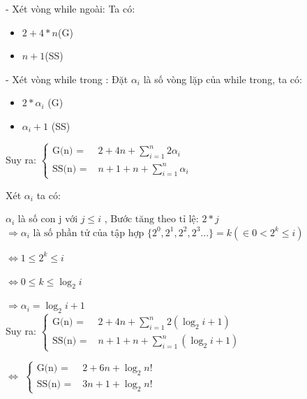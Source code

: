 \documentclass{article}
\newcommand\tab[1][1cm]{\hspace*{#1}}
\begin{document}
- Xét vòng while ngoài:
Ta có:
\begin{itemize}
    \item $ 2+4*n $(G)
    \item $ n + 1 $(SS)
\end{itemize}

- Xét vòng while trong :
Đặt $\alpha_{i}$ là số vòng lặp của while trong, ta có:
\begin{itemize}
    \item $ 2*\alpha_{i}$ (G)
    \item $ \alpha_{i} + 1$ (SS)
\end{itemize}

\tab Suy ra:
\(
\begin{cases}
    \text{G(n) = } & 2 + 4n +  \sum\limits_{i=1}^{n}2\alpha_{i} \\
    \text{SS(n) = } &  n + 1 + n + \sum\limits_{i=1}^{n}\alpha_{i}
\end{cases}
\)
\vspace{5mm}

Xét $\alpha_{i}$ ta có:

\tab $\alpha_{i}$ là số con j với $j \leq  i$ , \(\text{Bước tăng theo tỉ lệ: } 2*j\)\\

\(\Rightarrow  \alpha_{i} \text{ là số phần tử của tập hợp } \{ 2^0, 2^1,  2^2, 2^3... \}
= k (\in 0 < 2^k \leq  i)\) 
\vspace{5mm}

\(\Leftrightarrow  1 \leq  2^k \leq  i\)

\vspace{2mm}
\(\Leftrightarrow  0 \leq k \leq  \log_{2}{i} \) 

\vspace{2mm}
\tab \(\Longrightarrow \alpha_{i} = \log_{2}{i} + 1\)\\


 Suy ra:
\(
\begin{cases}
    \text{G(n) = } & 2 + 4n +  \sum\limits_{i=1}^{n}2(\log_{2}{i} + 1) \\
    \text{SS(n) = } &  n + 1 + n + \sum\limits_{i=1}^{n}(\log_{2}{i} + 1)
\end{cases}
\)
 
\vspace{2mm}
\tab \(\Longleftrightarrow \)   
\(
\begin{cases}
    \text{G(n) = } & 2 + 6n +  \log_{2}{n!}  \\
    \text{SS(n) = } &  3n + 1 + \log_{2}{n!}
\end{cases}
\)
\end{document}
